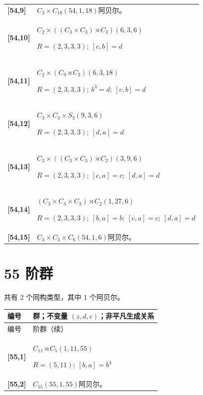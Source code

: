\documentclass[UTF8,fontset=fandol,11pt,a4paper]{ctexart}
\begin{document}
\begin{longtable}{@{}p{17mm}>{\raggedright\arraybackslash}p{141mm}@{}}
\textbf{[54,9]} & $C_{3}\times C_{18}$\quad $(54,1,18)$\quad 阿贝尔。\\[3pt]

\textbf{[54,10]} & $C_{2}\times ((C_{3}\times C_{3})\rtimes C_{3})$\quad $(6,3,6)$\par\(R=(2,3,3,3);\allowbreak\ [c,b]=d\)\\[3pt]

\textbf{[54,11]} & $C_{2}\times (C_{9}\rtimes C_{3})$\quad $(6,3,18)$\par\(R=(2,3,3,3);\allowbreak\ b^{3}=d;\allowbreak\ [c,b]=d\)\\[3pt]

\textbf{[54,12]} & $C_{3}\times C_{3}\times S_{3}$\quad $(9,3,6)$\par\(R=(2,3,3,3);\allowbreak\ [d,a]=d\)\\[3pt]

\textbf{[54,13]} & $C_{3}\times ((C_{3}\times C_{3})\rtimes C_{2})$\quad $(3,9,6)$\par\(R=(2,3,3,3);\allowbreak\ [c,a]=c;\allowbreak\ [d,a]=d\)\\[3pt]

\textbf{[54,14]} & $(C_{3}\times C_{3}\times C_{3})\rtimes C_{2}$\quad $(1,27,6)$\par\(R=(2,3,3,3);\allowbreak\ [b,a]=b;\allowbreak\ [c,a]=c;\allowbreak\ [d,a]=d\)\\[3pt]

\textbf{[54,15]} & $C_{3}\times C_{3}\times C_{6}$\quad $(54,1,6)$\quad 阿贝尔。\\[3pt]

\end{longtable}\endgroup

\section*{55 阶群}\label{order:55}

共有 $2$ 个同构类型，其中 $1$ 个阿贝尔。

\begingroup\small\setlength{\tabcolsep}{3pt}\renewcommand{\arraystretch}{1.12}

\begin{longtable}{@{}p{17mm}>{\raggedright\arraybackslash}p{141mm}@{}}

\toprule 编号 & 群；不变量 $(z,d,e)$；非平凡生成关系\\\midrule\endfirsthead

\toprule 编号 & 55 阶群（续）\\\midrule\endhead\bottomrule\endfoot

\textbf{[55,1]} & $C_{11}\rtimes C_{5}$\quad $(1,11,55)$\par\(R=(5,11);\allowbreak\ [b,a]=b^{3}\)\\[3pt]

\textbf{[55,2]} & $C_{55}$\quad $(55,1,55)$\quad 阿贝尔。\\[3pt]

\end{longtable}\endgroup
\end{document}
